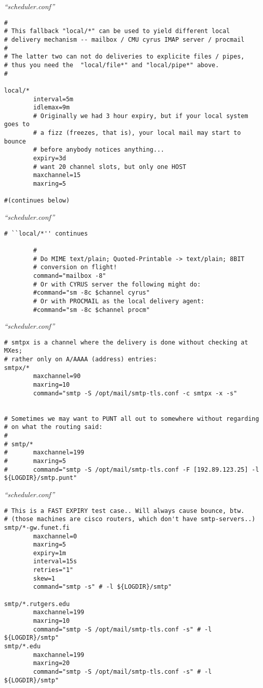\documentclass[a4paper,landscape]{slides}
\begin{document}
\begin{overlay}
\small
\centerline{{\em ``scheduler.conf''}}
\tiny
\begin{verbatim}
#
# This fallback "local/*" can be used to yield different local
# delivery mechanism -- mailbox / CMU cyrus IMAP server / procmail
#
# The latter two can not do deliveries to explicite files / pipes,
# thus you need the  "local/file*" and "local/pipe*" above.
#

local/*
        interval=5m
        idlemax=9m
        # Originally we had 3 hour expiry, but if your local system goes to
        # a fizz (freezes, that is), your local mail may start to bounce
        # before anybody notices anything...
        expiry=3d
        # want 20 channel slots, but only one HOST
        maxchannel=15
        maxring=5

#(continues below)
\end{verbatim}
\vfill
\end{overlay}
\begin{overlay}
\small
\centerline{{\em ``scheduler.conf''}}
\tiny
\begin{verbatim}
# ``local/*'' continues

        #
        # Do MIME text/plain; Quoted-Printable -> text/plain; 8BIT
        # conversion on flight!
        command="mailbox -8"
        # Or with CYRUS server the following might do:
        #command="sm -8c $channel cyrus"
        # Or with PROCMAIL as the local delivery agent:
        #command="sm -8c $channel procm"
\end{verbatim}
\vfill
\end{overlay}
\begin{overlay}
\small
\centerline{{\em ``scheduler.conf''}}
\tiny
\begin{verbatim}
# smtpx is a channel where the delivery is done without checking at MXes;
# rather only on A/AAAA (address) entries:
smtpx/*
        maxchannel=90
        maxring=10
        command="smtp -S /opt/mail/smtp-tls.conf -c smtpx -x -s"


# Sometimes we may want to PUNT all out to somewhere without regarding
# on what the routing said:
#
# smtp/*
#       maxchannel=199
#       maxring=5
#       command="smtp -S /opt/mail/smtp-tls.conf -F [192.89.123.25] -l ${LOGDIR}/smtp.punt"
\end{verbatim}
\vfill
\end{overlay}
\begin{overlay}
\small
\centerline{{\em ``scheduler.conf''}}
\tiny
\begin{verbatim}
# This is a FAST EXPIRY test case.. Will always cause bounce, btw.
# (those machines are cisco routers, which don't have smtp-servers..)
smtp/*-gw.funet.fi
        maxchannel=0
        maxring=5
        expiry=1m
        interval=15s
        retries="1"
        skew=1
        command="smtp -s" # -l ${LOGDIR}/smtp"

smtp/*.rutgers.edu
        maxchannel=199
        maxring=10
        command="smtp -S /opt/mail/smtp-tls.conf -s" # -l ${LOGDIR}/smtp"
smtp/*.edu
        maxchannel=199
        maxring=20
        command="smtp -S /opt/mail/smtp-tls.conf -s" # -l ${LOGDIR}/smtp"
\end{verbatim}
\vfill
\end{overlay}
\end{document}
